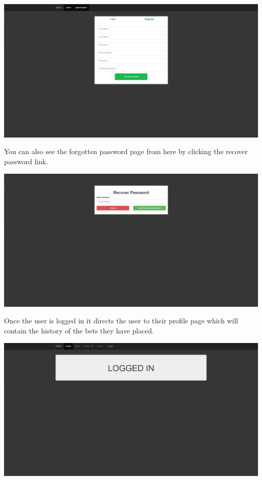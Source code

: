 \includegraphics[width=\textwidth,height=\textheight,keepaspectratio]{img/screenshots/register.png}

You can also see the forgotten password page from here by clicking the recover password link.

\includegraphics[width=\textwidth,height=\textheight,keepaspectratio]{img/screenshots/recover.png}

Once the user is logged in it directs the user to their profile page which will contain the history of the bets they have placed.

\includegraphics[width=\textwidth,height=\textheight,keepaspectratio]{img/screenshots/admin.png}

